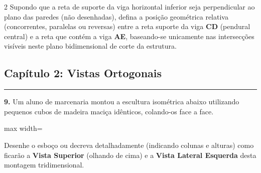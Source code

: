 \documentclass[twoside, 10pt, a4paper]{article}
\begin{document}
\begin{multicols*}{2}
Supondo que a reta de suporte da viga horizontal inferior seja perpendicular ao plano das paredes (não desenhadas), defina a posição geométrica relativa (concorrentes, paralelas ou reversas) entre a reta suporte da viga \textbf{CD} (pendural central) e a reta que contém a viga \textbf{AE}, baseando-se unicamente nas intersecções visíveis neste plano bidimensional de corte da estrutura.

\vspace{0.5cm}
\subsection*{Capítulo 2: Vistas Ortogonais}
\vspace{-0.2cm}\noindent\rule{\linewidth}{1.2pt} 
\par\par\vspace{0.5cm}
\textbf{9.} Um aluno de marcenaria montou a escultura isométrica abaixo utilizando pequenos cubos de madeira maciça idênticos, colando-os face a face.
\begin{center}
\begin{adjustbox}{max width=\linewidth}
\end{adjustbox}
\end{center}

Desenhe o esboço ou decreva detalhadamente (indicando colunas e alturas) como ficarão a \textbf{Vista Superior} (olhando de cima) e a \textbf{Vista Lateral Esquerda} desta montagem tridimensional.


\end{multicols*}
\end{document}
